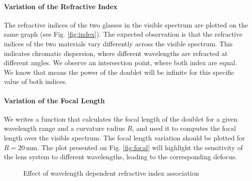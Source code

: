 \documentclass[10pt,letterpaper]{article}
\begin{document}
\paragraph{Variation of the Refractive Index\\}
The refractive indices of the two glasses in the visible spectrum are plotted on the same graph (see Fig. \ref{fig:index}). The expected observation is that the refractive indices of the two materials vary differently across the visible spectrum. This indicates chromatic dispersion, where different wavelengths are refracted at different angles. We observe an intersection point, where both index are equal. We know that means the power of the doublet will be infinite for this specific value of both indices.

\paragraph{Variation of the Focal Length\\}
We writes a function that calculates the focal length of the doublet for a given wavelength range and a curvature radius \(R\), and used it to computes the focal length over the visible spectrum. The focal length variation should be plotted for \(R = 20 \, \text{mm}\). The plot presented on Fig. \ref{fig:focal} will highlight the sensitivity of the lens system to different wavelengths, leading to the corresponding defocus.

\begin{figure}[h]
    \centering
	\caption{Effect of wavelength dependent refractive index association}
\end{figure}
\end{document}
